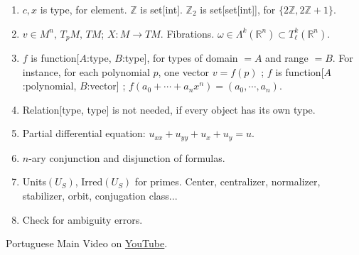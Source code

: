 \documentclass[11pt,a4paper]{article}
\newenvironment{myenum}
{ \begin{enumerate}
    \setlength{\itemsep}{0pt}
    \setlength{\parskip}{0pt}
    \setlength{\parsep}{0pt}     }
{ \end{enumerate}                  }
\begin{document}
\begin{myenum}
		$f = \lim$ function[$A$:interval, $B$:real] is function[$A$:interval, $C$:extended[real]].
		\item $c, x$ is type, for element. $\mathbb{Z}$ is set[int]. $\mathbb{Z}_2$ is set[set[int]], for $\{2\mathbb{Z}, 2\mathbb{Z} + 1 \}$.
		\item $v \in M^n,\,T_pM,\,TM$; $X: M \rightarrow TM$. Fibrations. $\omega \in \Lambda^k(\mathbb{R}^n) \subset T^k_\ell(\mathbb{R}^n)$.
		\item $f$ is function[$A$:type, $B$:type], for types of domain $=A$ and range $=B$. For instance, for each polynomial $p$, one vector $v = f(p)$ ; $f$ is function[$A$:polynomial, $B$:vector] ; $f(a_0 + \cdots + a_n x^n) = (a_0, \cdots, a_n)$.
		\item Relation[type, type] is not needed, if every object has its own type.
		\item Partial differential equation: $u_{xx} + u_{yy} + u_x + u_y = u$.
		\item $n$-ary conjunction and disjunction of formulas.
		\item Units$(U_S)$, Irred$(U_S)$ for primes. Center, centralizer, normalizer, stabilizer, orbit, conjugation class...
		\item Check for ambiguity errors.
		\end{myenum}

		\vspace{3mm}

Portuguese Main Video on \href{https://www.youtube.com/watch?v=OUaltUyhTSM}{\color{blue}\underline{YouTube}}.
\end{document}
